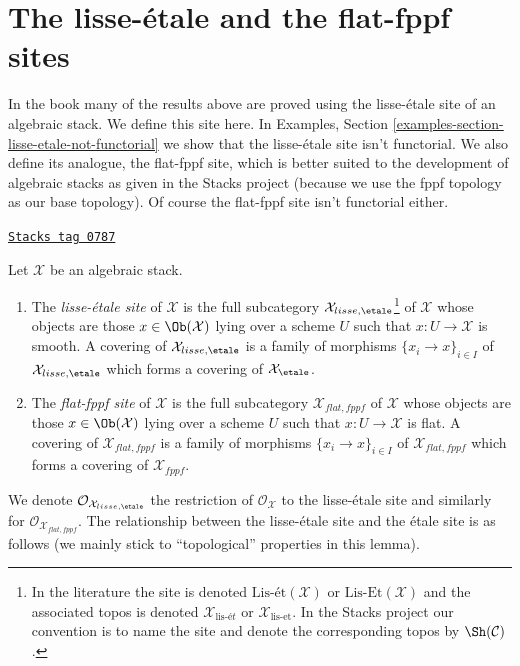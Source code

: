 \section{The lisse-\'etale and the flat-fppf sites}
\label{stacks-cohomology-section-lisse-etale}
In the book \cite{LM-B} many of the results above are proved using the
lisse-\'etale site of an algebraic stack. We define this site here.
In Examples, Section \ref{examples-section-lisse-etale-not-functorial}
we show that the lisse-\'etale site isn't functorial.
We also define its analogue, the flat-fppf site, which is better suited
to the development of algebraic stacks as given in the Stacks project
(because we use the fppf topology as our base topology). Of course the
flat-fppf site isn't functorial either.

\begin{definition}
\label{stacks-cohomology-definition-lisse-etale}
\href{https://stacks.math.columbia.edu/tag/0787}{\texttt{Stacks tag 0787}}

Let $\mathcal{X}$ be an algebraic stack.
\begin{enumerate}
\item The {\it lisse-\'etale site} of $\mathcal{X}$ is the full subcategory
$\mathcal{X}_{lisse,\etale}$\footnote{In the literature the
site is denoted $\text{Lis-\'et}(\mathcal{X})$ or
$\text{Lis-Et}(\mathcal{X})$ and the associated topos is denoted
$\mathcal{X}_{\text{lis-\'e}t}$ or $\mathcal{X}_{\text{lis-et}}$.
In the Stacks project our convention is to name the site and
denote the corresponding topos by $\Sh(\mathcal{C})$.} of $\mathcal{X}$
whose objects are those $x \in \Ob(\mathcal{X})$ lying over a scheme $U$
such that $x : U \to \mathcal{X}$ is smooth. A covering of
$\mathcal{X}_{lisse,\etale}$ is a family of morphisms
$\{x_i \to x\}_{i \in I}$ of $\mathcal{X}_{lisse,\etale}$
which forms a covering of $\mathcal{X}_\etale$.
\item The {\it flat-fppf site} of $\mathcal{X}$ is the full subcategory
$\mathcal{X}_{flat,fppf}$ of $\mathcal{X}$
whose objects are those $x \in \Ob(\mathcal{X})$ lying over a scheme $U$
such that $x : U \to \mathcal{X}$ is flat. A covering of
$\mathcal{X}_{flat,fppf}$ is a family of morphisms
$\{x_i \to x\}_{i \in I}$ of $\mathcal{X}_{flat,fppf}$
which forms a covering of $\mathcal{X}_{fppf}$.
\end{enumerate}
\end{definition}

We denote $\mathcal{O}_{\mathcal{X}_{lisse,\etale}}$
the restriction of $\mathcal{O}_\mathcal{X}$ to the lisse-\'etale site
and similarly for $\mathcal{O}_{\mathcal{X}_{flat,fppf}}$.
The relationship between the lisse-\'etale site and the \'etale site is
as follows (we mainly stick to ``topological'' properties in this lemma).

